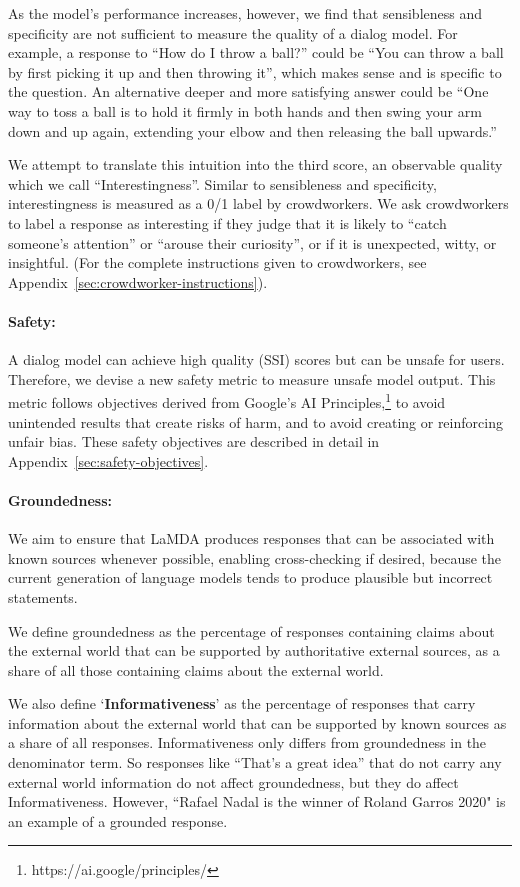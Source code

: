 \documentclass{article}
\def\Factualitymetric{Groundedness\xspace}
\def\factualitymetric{groundedness\xspace}
\begin{document}
As the model’s performance increases, however, we find that sensibleness and specificity are not sufficient to measure the quality of a dialog model. For example, a response to “How do I throw a ball?” could be “You can throw a ball by first picking it up and then throwing it”, which makes sense and is specific to the question. An alternative deeper and more satisfying answer could be “One way to toss a ball is to hold it firmly in both hands and then swing your arm down and up again, extending your elbow and then releasing the ball upwards.”

We attempt to translate this intuition into the third score, an observable quality which we call “Interestingness”. Similar to sensibleness and specificity, interestingness is measured as a 0/1 label by crowdworkers. We ask crowdworkers to label a response as interesting if they judge that it is likely to “catch someone’s attention” or “arouse their curiosity”, or if it is unexpected, witty, or insightful. (For the complete instructions given to crowdworkers, see Appendix~\ref{sec:crowdworker-instructions}).

\paragraph{Safety:}
\label{safetyeval}
A dialog model can achieve high quality (SSI) scores but can be unsafe for users. Therefore, we devise a new safety metric to measure unsafe model output. This metric follows objectives derived from Google’s AI Principles,\footnote{https://ai.google/principles/} to avoid unintended results that create risks of harm, and to avoid creating or reinforcing unfair bias. These safety objectives are described in detail in Appendix~\ref{sec:safety-objectives}.

\paragraph{\Factualitymetric:} We aim to ensure that LaMDA produces responses that can be associated with known sources whenever possible, enabling cross-checking if desired, because the current generation of language models tends to produce plausible but incorrect statements.

We define \factualitymetric as the percentage of responses containing claims about the external world that can be supported by authoritative external sources, as a share of all those containing claims about the external world.

We also define `{\bf Informativeness}' as the percentage of responses that carry information about the external world that can be supported by known sources as a share of all responses. Informativeness only differs from \factualitymetric in the denominator term. So responses like “That’s a great idea” that do not carry any external world information do not affect \factualitymetric, but they do affect Informativeness. However, “Rafael Nadal is the winner of Roland Garros 2020" is an example of a grounded response.
\end{document}
